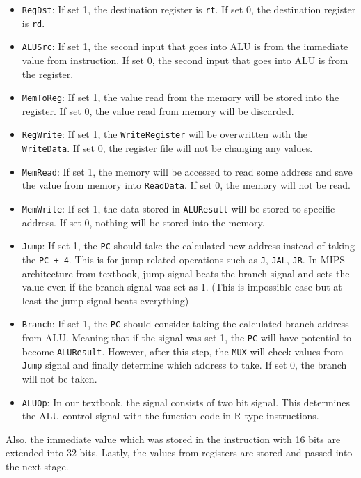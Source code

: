 \documentclass{homework}
\begin{document}
\begin{itemize}
    \item \texttt{RegDst}: If set 1, the destination register is \texttt{rt}. If set 0, the destination register is \texttt{rd}. 
    \item \texttt{ALUSrc}: If set 1, the second input that goes into ALU is from the immediate value from instruction. If set 0, the second input that goes into ALU is from the register.
    \item \texttt{MemToReg}: If set 1, the value read from the memory will be stored into the register. If set 0, the value read from memory will be discarded.
    \item \texttt{RegWrite}: If set 1, the \texttt{WriteRegister} will be overwritten with the \texttt{WriteData}. If set 0, the register file will not be changing any values.
    \item \texttt{MemRead}: If set 1, the memory will be accessed to read some address and save the value from memory into \texttt{ReadData}. If set 0, the memory will not be read.
    \item \texttt{MemWrite}: If set 1, the data stored in \texttt{ALUResult} will be stored to specific address. If set 0, nothing will be stored into the memory.
    \item \texttt{Jump}: If set 1, the \texttt{PC} should take the calculated new address instead of taking the \texttt{PC + 4}. This is for jump related operations such as \texttt{J}, \texttt{JAL}, \texttt{JR}. In MIPS architecture from textbook, jump signal beats the branch signal and sets the value even if the branch signal was set as 1. (This is impossible case but at least the jump signal beats everything)
    \item \texttt{Branch}: If set 1, the \texttt{PC} should consider taking the calculated branch address from ALU. Meaning that if the signal was set 1, the \texttt{PC} will have potential to become \texttt{ALUResult}. However, after this step, the \texttt{MUX} will check values from \texttt{Jump} signal and finally determine which address to take. If set 0, the branch will not be taken.
    \item \texttt{ALUOp}: In our textbook, the signal consists of two bit signal. This determines the ALU control signal with the function code in R type instructions. 
\end{itemize} 

Also, the immediate value which was stored in the instruction with 16 bits are extended into 32 bits. Lastly, the values from registers are stored and passed into the next stage.
\end{document}
